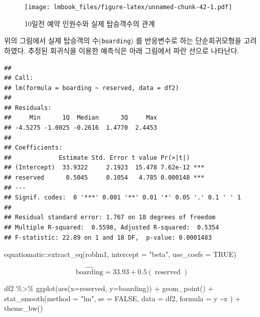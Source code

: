 \documentclass[
  10pt,
]{book}
\newenvironment{Shaded}{\begin{snugshade}}{\end{snugshade}}
\newcommand{\AttributeTok}[1]{\textcolor[rgb]{0.77,0.63,0.00}{#1}}
\newcommand{\ConstantTok}[1]{\textcolor[rgb]{0.00,0.00,0.00}{#1}}
\newcommand{\FunctionTok}[1]{\textcolor[rgb]{0.00,0.00,0.00}{#1}}
\newcommand{\NormalTok}[1]{#1}
\newcommand{\OtherTok}[1]{\textcolor[rgb]{0.56,0.35,0.01}{#1}}
\newcommand{\SpecialCharTok}[1]{\textcolor[rgb]{0.00,0.00,0.00}{#1}}
\newcommand{\StringTok}[1]{\textcolor[rgb]{0.31,0.60,0.02}{#1}}
\theoremstyle{definition}
\theoremstyle{definition}
\theoremstyle{definition}
\theoremstyle{definition}
\theoremstyle{remark}
\begin{document}
\begin{figure}
\centering
\texttt{[image: lmbook\_files/figure-latex/unnamed-chunk-42-1.pdf]}
\caption{\label{fig:unnamed-chunk-42}10일전 예약 인원수와 실제 탑승객수의 관계}
\end{figure}

위의 그림에서 실제 탑승객의 수(\texttt{boarding}) 를 반응변수로 하는 단순회귀모형을 고려하였다. 추정된 회귀식을 이용한 예측식은 아래 그림에서 파란 선으로 나타난다.

\begin{Shaded}
\end{Shaded}

\begin{verbatim}
## 
## Call:
## lm(formula = boarding ~ reserved, data = df2)
## 
## Residuals:
##     Min      1Q  Median      3Q     Max 
## -4.5275 -1.0025 -0.2616  1.4770  2.4453 
## 
## Coefficients:
##             Estimate Std. Error t value Pr(>|t|)    
## (Intercept)  33.9322     2.1923  15.478 7.62e-12 ***
## reserved      0.5045     0.1054   4.785 0.000148 ***
## ---
## Signif. codes:  0 '***' 0.001 '**' 0.01 '*' 0.05 '.' 0.1 ' ' 1
## 
## Residual standard error: 1.767 on 18 degrees of freedom
## Multiple R-squared:  0.5598, Adjusted R-squared:  0.5354 
## F-statistic: 22.89 on 1 and 18 DF,  p-value: 0.0001483
\end{verbatim}

\begin{Shaded}
\begin{Highlighting}[]
\NormalTok{equatiomatic}\SpecialCharTok{::}\FunctionTok{extract\_eq}\NormalTok{(roblm1, }\AttributeTok{intercept =} \StringTok{"beta"}\NormalTok{,  }\AttributeTok{use\_coefs =} \ConstantTok{TRUE}\NormalTok{)}
\end{Highlighting}
\end{Shaded}

\[
\operatorname{\widehat{boarding}} = 33.93 + 0.5(\operatorname{reserved})
\]

\begin{Shaded}
\begin{Highlighting}[]
\NormalTok{df2 }\SpecialCharTok{\%\textgreater{}\%} \FunctionTok{ggplot}\NormalTok{(}\FunctionTok{aes}\NormalTok{(}\AttributeTok{x=}\NormalTok{reserved, }\AttributeTok{y=}\NormalTok{boarding)) }\SpecialCharTok{+} 
  \FunctionTok{geom\_point}\NormalTok{() }\SpecialCharTok{+} 
  \FunctionTok{stat\_smooth}\NormalTok{(}\AttributeTok{method =} \StringTok{"lm"}\NormalTok{, }\AttributeTok{se =} \ConstantTok{FALSE}\NormalTok{, }\AttributeTok{data =}\NormalTok{ df2,}
              \AttributeTok{formula =}\NormalTok{ y }\SpecialCharTok{\textasciitilde{}}\NormalTok{x ) }\SpecialCharTok{+}
  \FunctionTok{theme\_bw}\NormalTok{()}
\end{Highlighting}
\end{Shaded}
\end{document}
